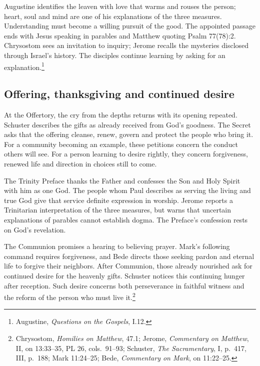 Augustine identifies the leaven with love that warms and rouses the person; heart, soul and mind are one of his explanations of the three measures. Understanding must become a willing pursuit of the good. The appointed passage ends with Jesus speaking in parables and Matthew quoting Psalm 77(78):2. Chrysostom sees an invitation to inquiry; Jerome recalls the mysteries disclosed through Israel's history. The disciples continue learning by asking for an explanation.\footnote{Augustine, \textit{Questions on the Gospels}, I.12.}

\subsection{Offering, thanksgiving and continued desire}

At the Offertory, the cry from the depths returns with its opening repeated. Schuster describes the gifts as already received from God's goodness. The Secret asks that the offering cleanse, renew, govern and protect the people who bring it. For a community becoming an example, these petitions concern the conduct others will see. For a person learning to desire rightly, they concern forgiveness, renewed life and direction in choices still to come.

The Trinity Preface thanks the Father and confesses the Son and Holy Spirit with him as one God. The people whom Paul describes as serving the living and true God give that service definite expression in worship. Jerome reports a Trinitarian interpretation of the three measures, but warns that uncertain explanations of parables cannot establish dogma. The Preface's confession rests on God's revelation.

The Communion promises a hearing to believing prayer. Mark's following command requires forgiveness, and Bede directs those seeking pardon and eternal life to forgive their neighbors. After Communion, those already nourished ask for continued desire for the heavenly gifts. Schuster notices this continuing hunger after reception. Such desire concerns both perseverance in faithful witness and the reform of the person who must live it.\footnote{Chrysostom, \textit{Homilies on Matthew}, 47.1; Jerome, \textit{Commentary on Matthew}, II, on 13:33--35, PL 26, cols.~91--93; Schuster, \textit{The Sacramentary}, I, p.~417, III, p.~188; Mark 11:24--25; Bede, \textit{Commentary on Mark}, on 11:22--25.}
